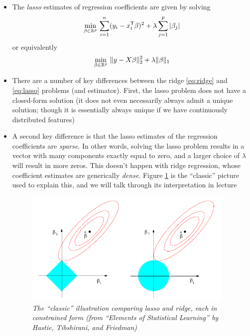 \documentclass{article}
\begin{document}
\begin{itemize}
\item The \emph{lasso} estimates of regression coefficients are given by solving    
  \[
  \min_{\beta \in \mathbb{R}^p} \, \sum_{i=1}^n (y_i - x_i^{\mathsf{T}} \beta)^2 + \lambda
  \sum_{j=1}^p |\beta_j|
  \]
  or equivalently
  \begin{equation}
  \label{eq:lasso}
  \min_{\beta \in \mathbb{R}^p} \, \|y - X \beta\|_2^2 + \lambda \|\beta\|_1
  \end{equation}

\item There are a number of key differences between the ridge \eqref{eq:ridge}
  and \eqref{eq:lasso} problems (and estimator). First, the lasso problem does
  not have a closed-form solution (it does not even necessarily always admit a
  unique solution; though it is essentially always unique if we have
  continuously distributed features)

\item A second key difference is that the lasso estimates of the regression
  coefficients are \emph{sparse}. In other words, solving the lasso problem
  results in a vector \smash{$\hbeta$} with many components exactly equal to
  zero, and a larger choice of $\lambda$ will result in more zeros. This doesn't
  happen with ridge regression, whose coefficient estimates are generically
  \emph{dense}. Figure \ref{fig:lasso_ridge} is the ``classic'' picture used to
  explain this, and we will talk through its interpretation in lecture 

\begin{figure}[htb]
\centering
\includegraphics[width=0.95\textwidth]{lasso_ridge.pdf}
\caption{\it The ``classic'' illustration comparing lasso and ridge, each in
  constrained form (from ``Elements of Statistical Learning'' by Hastie,
  Tibshirani, and Friedman)}
\label{fig:lasso_ridge}
\end{figure}


\end{itemize}
\end{document}
